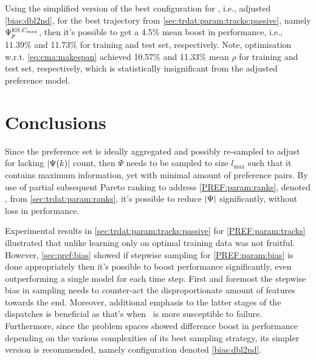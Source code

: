 
Using the simplified version of the best configuration for , 
i.e., adjusted \ref{bias:dbl2nd}, for the best  trajectory from  
\cref{sec:trdat:param:tracks:passive}, namely $\Psi^{\text{ES}.{C_{\max}}}_p$, then it's 
possible to get a 4.5\% mean boost in performance, i.e., 11.39\% and 11.73\% 
for training and test set, respectively. 
Note, optimisation w.r.t. \cref{eq:cma:makespan} achieved 10.57\% 
and 11.33\% mean $\rho$ for training and test set, respectively, which is 
statistically insignificant from the adjusted preference model.

\clearpage
\section{Conclusions}
Since the preference set is ideally aggregated and possibly re-sampled 
to adjust for lacking $\lvert\Psi(k)\rvert$ count, then $\Psi$ needs to be sampled to 
size $l_{\max}$ such that it contains maximum information, yet with minimal 
amount of preference pairs. 
By use of partial subsequent Pareto ranking to address \ref{PREF:param:ranks}, 
denoted , from \cref{sec:trdat:param:ranks}, it's possible to reduce 
$\lvert\Psi\rvert$ significantly, without loss in performance. 

Experimental results in \cref{sec:trdat:param:tracks:passive} for 
\ref{PREF:param:tracks} illustrated that unlike 
\citet{Siggi10,Malik08,Russell09} learning only on optimal training data was 
not fruitful. 
However, \cref{sec:pref:bias} showed if stepwise sampling for 
\ref{PREF:param:bias} is done appropriately then it's possible to boost 
performance significantly, even outperforming a single model for each time step.
First and foremost the stepwise bias in sampling needs to counter-act the 
disproportionate amount of features towards the end. 
Moreover, additional emphasis to the latter stages of the dispatches is 
beneficial as that's when \JSP\ is more susceptible to failure. 
Furthermore, since the problem spaces showed difference boost in performance 
depending on the various complexities of its best sampling strategy, its 
simpler version is recommended, namely configuration denoted \ref{bias:dbl2nd}.

